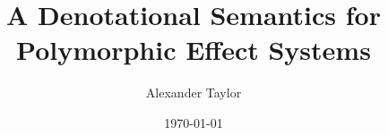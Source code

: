 \documentclass{Report}
\title{A Denotational Semantics for Polymorphic Effect Systems}
\date{\today}
\author{Alexander Taylor}
\begin{document}
\maketitle

\newcommand{\note}[1]{
}



\tableofcontents















 



\appendix







\end{document}
